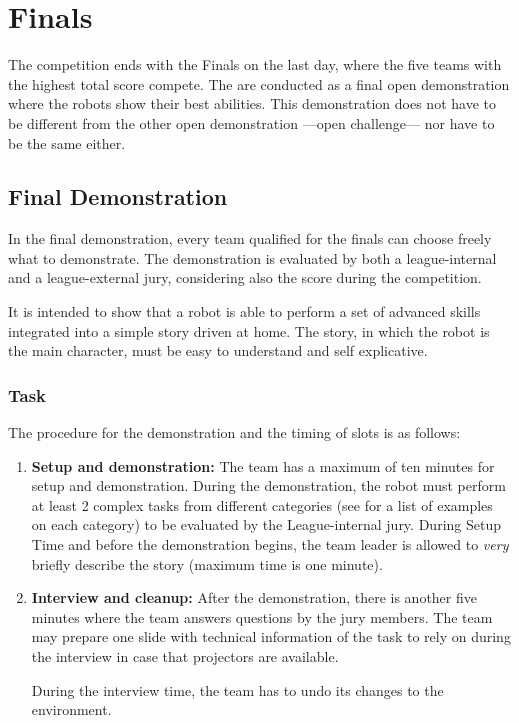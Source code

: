 \chapter{Finals}

The competition ends with the Finals on the last day, where the five teams with the highest total score compete. The  are conducted as a final open demonstration where the robots show their best abilities. This demonstration does not have to be different from the other open demonstration ---open challenge--- nor have to be the same either.

\section{Final Demonstration}

In the final demonstration, every team qualified for the finals can choose freely what to demonstrate. The demonstration is evaluated by both a league-internal and a league-external jury, considering also the score during the competition.

It is intended to show that a robot is able to perform a set of advanced skills integrated into a simple story driven at home. The story, in which the robot is the main character, must be easy to understand and self explicative.

\subsection{Task}
The procedure for the demonstration and the timing of slots is as follows:
\begin{enumerate}
  \item \textbf{Setup and demonstration:} The team has a maximum of ten minutes for setup and demonstration. During the demonstration, the robot must perform at least 2 complex tasks from different categories (see for a list of examples on each category) to be evaluated by the League-internal jury. During Setup Time and before the demonstration begins, the team leader is allowed to \emph{very} briefly describe the story (maximum time is one minute). \\
  \item \textbf{Interview and cleanup:} After the demonstration, there is another five minutes where the team answers questions by the jury members. The team may prepare one slide with technical information of the task to rely on during the interview in case that projectors are available.

  During the interview time, the team has to undo its changes to the environment.
\end{enumerate}

